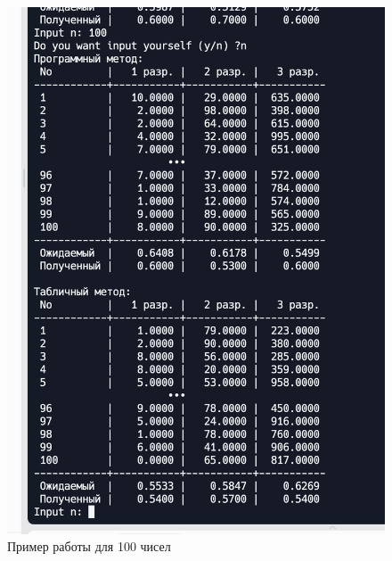 \documentclass[a4paper, 12pt]{article}
\begin{document}
\begin{figure}[t!]
	\centering \includegraphics[scale=0.7]{100}
	\centering\caption{Пример работы для 100 чисел}
\end{figure}
\clearpage
\newpage
\end{document}
